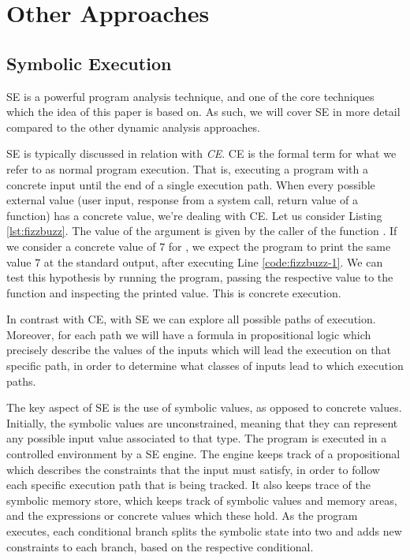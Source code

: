\section{Other Approaches}

\subsection{Symbolic Execution}


\gls{SE} is a powerful program analysis technique, and one of the core techniques which the idea of this paper is based on. As such, we will cover \gls{SE} in more detail compared to the other dynamic analysis approaches.

\gls{SE} is typically discussed in relation with \emph{\gls{CE}}. \gls{CE} is the formal term for what we refer to as normal program execution. That is, executing a program with a concrete input until the end of a single execution path. When every possible external value (user input, response from a system call, return value of a function) has a concrete value, we're dealing with \gls{CE}.
Let us consider Listing \ref{lst:fizzbuzz}. The value of the argument  is given by the caller of the function . If we consider a concrete value of $7$ for , we expect the program to print the same value $7$ at the standard output, after executing Line \ref{code:fizzbuzz-1}. We can test this hypothesis by running the program, passing the respective value to the function and inspecting the printed value. This is concrete execution.



In contrast with \gls{CE}, with \gls{SE} we can explore all possible paths of execution. Moreover, for each path we will have a formula in propositional logic which precisely describe the values of the inputs which will lead the execution on that specific path, in order to determine what classes of inputs lead to which execution paths. %

The key aspect of \gls{SE} is the use of symbolic values, as opposed to concrete values. Initially, the symbolic values are unconstrained, meaning that they can represent any possible input value associated to that type. The program is executed in a controlled environment by a \gls{SE} engine. The engine keeps track of a propositional which describes the constraints that the input must satisfy, in order to follow each specific execution path that is being tracked. It also keeps trace of the symbolic memory store, which keeps track of symbolic values and memory areas, and the expressions or concrete values which these hold. As the program executes, each conditional branch splits the symbolic state into two and adds new constraints to each branch, based on the respective conditional.

